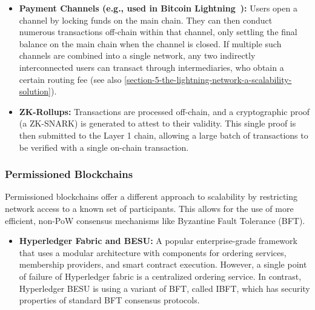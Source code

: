 \begin{itemize}
\item
  \textbf{Payment Channels (e.g., used in Bitcoin Lightning~\cite{poon2016bitcoin}):} Users open a
  channel by locking funds on the main chain. They can then conduct
  numerous transactions off-chain within that channel, only settling the
  final balance on the main chain when the channel is closed.
  If multiple such channels are combined into a single network, any two indirectly interconnected users can transact through intermediaries, who obtain a certain routing fee (see also \autoref{section-5-the-lightning-network-a-scalability-solution}).

\item
  \textbf{ZK-Rollups:} Transactions are processed off-chain, and a
  cryptographic proof (a ZK-SNARK) is generated to attest to their
  validity. This single proof is then submitted to the Layer 1 chain,
  allowing a large batch of transactions to be verified with a single
  on-chain transaction.
\end{itemize}

\subsubsection{Permissioned
Blockchains}\label{permissioned-blockchains}

Permissioned blockchains offer a different approach to scalability by
restricting network access to a known set of participants. This allows
for the use of more efficient, non-PoW consensus mechanisms like
Byzantine Fault Tolerance (BFT).

\begin{itemize}
\tightlist
\item
  \textbf{Hyperledger Fabric and BESU:} A popular enterprise-grade framework that
  uses a modular architecture with components for ordering services,
  membership providers, and smart contract execution.
  However, a single point of failure of Hyperledger fabric is a centralized ordering service. 
  In contrast, Hyperledger BESU is using a variant of BFT, called IBFT, which has security properties of standard BFT consensus protocols.
  
  
\end{itemize}


